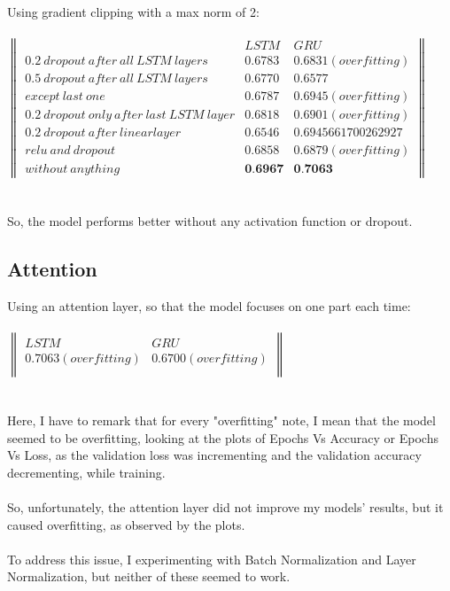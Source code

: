 \documentclass{article}
\begin{document}
Using gradient clipping with a max norm of 2: \\ \\
$\begin{Vmatrix}
& LSTM & GRU \\
0.2\ dropout\ after\ all\ LSTM\ layers  & 0.6783 & 0.6831(overfitting)\\
0.5\ dropout\ after\ all\ LSTM\ layers & 0.6770 & 0.6577\\
except\ last\ one  & 0.6787 & 0.6945(overfitting)\\
0.2\ dropout\ only\ after\ last\ LSTM\ layer  & 0.6818 & 0.6901(overfitting)\\
0.2\ dropout\ after\ linear layer & 0.6546 & 0.6945661700262927\\
relu\ and\ dropout  & 0.6858 & 0.6879(overfitting)\\
without\ anything & \textbf{0.6967} & \textbf{0.7063}
\end{Vmatrix}$ \\ \\ \\
So, the model performs better without any activation function or dropout. \\
\subsection{Attention}
Using an attention layer, so that the model focuses on one part each time: \\ \\
$\begin{Vmatrix}
LSTM & GRU \\
0.7063(overfitting) & 0.6700(overfitting)\\
\end{Vmatrix}$ \\ \\ \\
Here, I have to remark that for every "overfitting" note, I mean that the model seemed to be overfitting, looking at the plots of Epochs Vs Accuracy or Epochs Vs Loss, as the validation loss was incrementing and the validation accuracy decrementing, while training. \\ \\
So, unfortunately, the attention layer did not improve my models' results, but it caused overfitting, as observed by the plots. \\ \\
To address this issue, I experimenting with Batch Normalization and Layer Normalization, but neither of these seemed to work.
\end{document}
